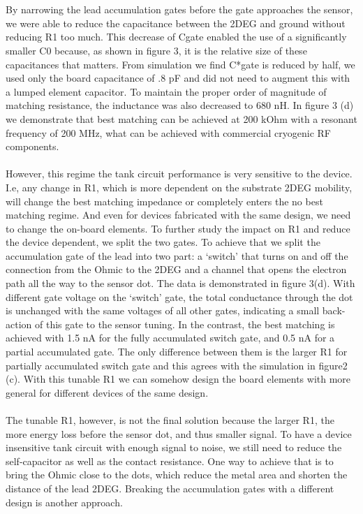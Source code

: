 \documentclass{article}
\begin{document}
	\\ \\
	By narrowing the lead accumulation gates before the gate approaches the sensor, we were able to reduce the capacitance between the 2DEG and ground without reducing R1 too much.  This decrease of Cgate enabled the use of a significantly smaller C0 because, as shown in figure 3, it is the relative size of these capacitances that matters. From simulation we find C*gate is reduced by half, we used only the board capacitance of .8 pF and did not need to augment this with a lumped element capacitor.  To maintain the proper order of magnitude of matching resistance, the inductance was also decreased to 680 nH.  In figure 3 (d) we demonstrate that best matching can be achieved at 200 kOhm with a resonant frequency of 200 MHz, what can be achieved with commercial cryogenic RF components.  
	\\ \\
	However, this regime the tank circuit performance is very sensitive to the device. I.e, any change in R1, which is more dependent on the substrate 2DEG mobility, will change the best matching impedance or completely enters the no best matching regime. And even for devices fabricated with the same design, we need to change the on-board elements. To further study the impact on R1 and reduce the device dependent, we split the two gates. To achieve that we split the accumulation gate of the lead into two part: a ‘switch’ that turns on and off the connection from the Ohmic to the 2DEG and a channel that opens the electron path all the way to the sensor dot. The data is demonstrated in figure 3(d). With different gate voltage on the ‘switch’ gate, the total conductance through the dot is unchanged with the same voltages of all other gates, indicating a small back-action of this gate to the sensor tuning. In the contrast, the best matching is achieved with 1.5 nA for the fully accumulated switch gate, and 0.5 nA for a partial accumulated gate. The only difference between them is the larger R1 for partially accumulated switch gate and this agrees with the simulation in figure2 (c). With this tunable R1 we can somehow design the board elements with more general for different devices of the same design.
	\\ \\
	The tunable R1, however, is not the final solution because the larger R1, the more energy loss before the sensor dot, and thus smaller signal. To have a device insensitive tank circuit with enough signal to noise, we still need to reduce the self-capacitor as well as the contact resistance. One way to achieve that is to bring the Ohmic close to the dots, which reduce the metal area and shorten the distance of the lead 2DEG. Breaking the accumulation gates with a different design is another approach.
\end{document}
